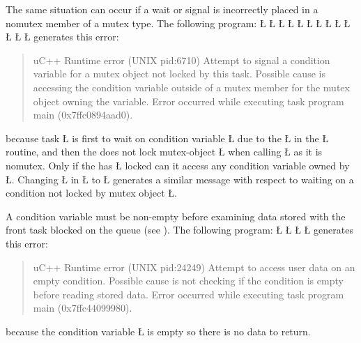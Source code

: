\documentclass[openright,twoside]{report}
\begin{document}
The same situation can occur if a wait or signal is incorrectly placed in a nomutex member of a mutex type.
The following program:
\LGinlinefalse\LGbegin\lgrinde
\L{}
\L{\LB{}}
\L{\LB{}}
\L{}
\L{\LB{}}
\L{\LB{}}
\L{\LB{}}
\L{\LB{\};}}
\endlgrinde\LGend
\LGinlinefalse\LGbegin\lgrinde
\L{}
\L{\LB{}}
\L{\LB{}}
\L{\LB{}}
\L{\LB{\}}}
\endlgrinde\LGend
generates this error:
\begin{quote}
\BGfont
uC++ Runtime error (UNIX pid:6710) Attempt to signal a condition variable for a mutex object not locked by this task.
Possible cause is accessing the condition variable outside of a mutex member for the mutex object owning the variable.
Error occurred while executing task program main (0x7ffc0894aad0).
\end{quote}
because task \LGinlinetrue\LGbegin\lgrinde\L{}\endlgrinde\LGend{} is first to wait on condition variable \LGinlinetrue\LGbegin\lgrinde\L{}\endlgrinde\LGend{} due to the \LGinlinetrue\LGbegin\lgrinde\L{}\endlgrinde\LGend{} in the \LGinlinetrue\LGbegin\lgrinde\L{}\endlgrinde\LGend{} routine, and then the  does not lock mutex-object \LGinlinetrue\LGbegin\lgrinde\L{}\endlgrinde\LGend{} when calling \LGinlinetrue\LGbegin\lgrinde\L{}\endlgrinde\LGend{} as it is nomutex.
Only if the  has \LGinlinetrue\LGbegin\lgrinde\L{}\endlgrinde\LGend{} locked can it access any condition variable owned by \LGinlinetrue\LGbegin\lgrinde\L{}\endlgrinde\LGend{}.
Changing \LGinlinetrue\LGbegin\lgrinde\L{}\endlgrinde\LGend{} in \LGinlinetrue\LGbegin\lgrinde\L{}\endlgrinde\LGend{} to \LGinlinetrue\LGbegin\lgrinde\L{}\endlgrinde\LGend{} generates a similar message with respect to waiting on a condition not locked by mutex object \LGinlinetrue\LGbegin\lgrinde\L{}\endlgrinde\LGend{}.

A condition variable must be non-empty before examining data stored with the front task blocked on the queue (see ).
The following program:
\LGinlinefalse\LGbegin\lgrinde
\L{}
\L{\LB{}}
\L{\LB{}}
\L{\LB{\}}}
\endlgrinde\LGend
generates this error:
\begin{quote}
\BGfont
uC++ Runtime error (UNIX pid:24249) Attempt to access user data on an empty condition.
Possible cause is not checking if the condition is empty before reading stored data.
Error occurred while executing task program main (0x7ffc44099980).
\end{quote}
because the condition variable \LGinlinetrue\LGbegin\lgrinde\L{}\endlgrinde\LGend{} is empty so there is no data to return.
\end{document}
